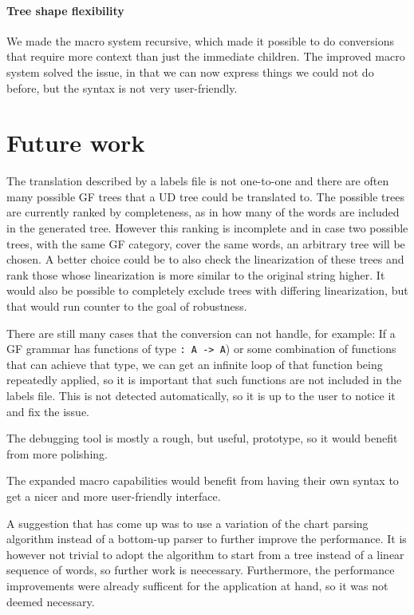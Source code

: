 \paragraph*{Tree shape flexibility}
We made the macro system recursive, which made it possible to do conversions that require more context than just the immediate children. The improved macro system solved the issue, in that we can now express things we could not do before, but the syntax is not very user-friendly.



\section{Future work}

%

The translation described by a labels file is not one-to-one and there are often many possible GF trees that a UD tree could be translated to. The possible trees are currently ranked by completeness, as in how many of the words are included in the generated tree. However this ranking is incomplete and in case two possible trees, with the same GF category, cover the same words, an arbitrary tree will be chosen. A better choice could be to also check the linearization of these trees and rank those whose linearization is more similar to the original string higher. It would also be possible to completely exclude trees with differing linearization, but that would run counter to the goal of robustness.

There are still many cases that the conversion can not handle, for example: If a GF grammar has functions of type \lstinline{: A -> A}) or some combination of functions that can achieve that type, we can get an infinite loop of that function being repeatedly applied, so it is important that such functions are not included in the labels file. This is not detected automatically, so it is up to the user to notice it and fix the issue.

The debugging tool is mostly a rough, but useful, prototype, so it would benefit from more polishing.

The expanded macro capabilities would benefit from having their own syntax to get a nicer and more user-friendly interface.

A suggestion that has come up was to use a variation of the chart parsing algorithm instead of a bottom-up parser to further improve the performance. It is however not trivial to adopt the algorithm to start from a tree instead of a linear sequence of words, so further work is neecessary. Furthermore, the performance improvements were already sufficent for the application at hand, so it was not deemed necessary.

